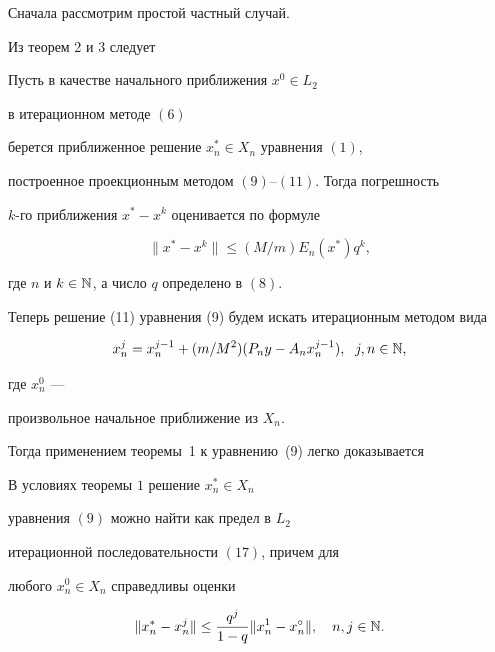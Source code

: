 Сначала рассмотрим простой частный случай.


Из теорем 2 и 3 следует





\begin{thm}


Пусть в качестве начального приближения $x^0\in L_2$


в итерационном методе $(6)$


берется приближенное решение $x_n^*\in X_n$ уравнения $(1)$,


построенное проекционным методом $(9)$--$(11)$. Тогда погрешность


$k$-го приближения $x^\ast -x^k$ оценивается по формуле


$$


\|x^\ast -x^k\|\leq (M/m) E_n(x^\ast) q^k,


$$


где $n$ и $k\in \Bbb N$, а число $q$ определено в $(8)$.


\end{thm}





Теперь решение (11) уравнения (9) будем искать итерационным методом вида


\begin{equation}


x_n^j=x_n^{j-1}+(m/M^2) (P_ny-A_nx_n^{j-1}),\ \;


j, n\in \Bbb N,


\end{equation}


где $x_n^0$ ---


произвольное начальное приближение из $X_n$.


Тогда применением теоремы~1 к уравнению~(9) легко доказывается





\begin{thm}


В условиях теоремы $1$ решение $x_n^*\in X_n$


уравнения $(9)$ можно найти как предел в $L_2$


итерационной последовательности $(17)$, причем для


любого $x_n^0\in X_n$ справедливы оценки


$$


\|x_n^*-x_n^j\|\leq \frac{q^{j}}{1-q}\|x_n^1-x_n^\circ\|,


\quad n, j\in \Bbb N.


$$


\end{thm}





